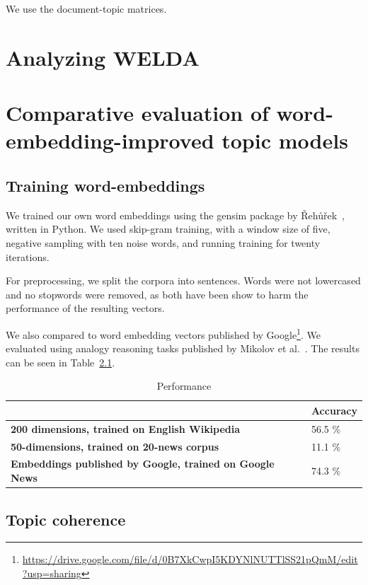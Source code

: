 \documentclass[
        a4paper,
        titlepage,
        twoside,
        parskip
        ]{scrbook}
\theoremstyle{break}
\begin{document}
We use the document-topic matrices.

\chapter{Analyzing WELDA}
\chapter{Comparative evaluation of word-embedding-improved topic models}
\section{Training word-embeddings}

We trained our own word embeddings using the gensim package by {\v R}eh{\r u}{\v r}ek~\cite{Rehurek2010}, written in Python.
We used skip-gram training, with a window size of five, negative sampling with ten noise words, and running training for twenty iterations.

For preprocessing, we split the corpora into sentences.
Words were not lowercased and no stopwords were removed, as both have been show to harm the performance of the resulting vectors.

We also compared to word embedding vectors published by Google\footnote{\url{https://drive.google.com/file/d/0B7XkCwpI5KDYNlNUTTlSS21pQmM/edit?usp=sharing}}.
We evaluated using analogy reasoning tasks published by Mikolov et al.~\cite{Mikolov2013}.
The results can be seen in Table~\ref{table:word_embeddings_performance}.

\begin{table}[]
  \centering
  \caption{Performance}
  \label{table:word_embeddings_performance}
  \begin{tabular}{ll}
  \hline
                                                                  & \textbf{Accuracy} \\ \hline
  \textbf{200 dimensions, trained on English Wikipedia}           & 56.5 \%           \\
  \textbf{50-dimensions, trained on 20-news corpus}               & 11.1 \%           \\
  \textbf{Embeddings published by Google, trained on Google News} & 74.3 \%
  \end{tabular}
\end{table}


\section{Topic coherence}
\end{document}
